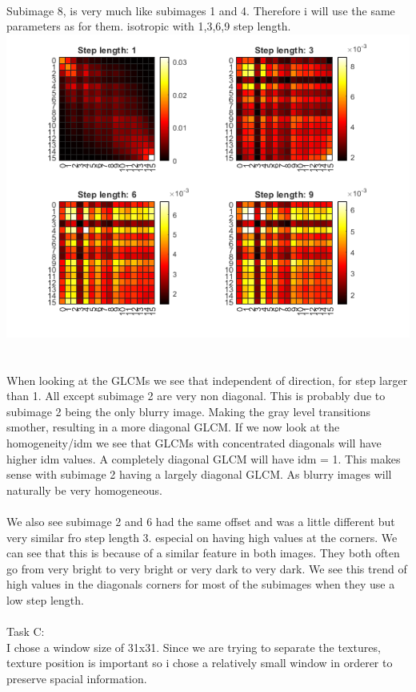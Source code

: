 \documentclass[12pt, letterpaper, twoside]{article}
\begin{document}
\newpage
\ \\
Subimage 8, is very much like subimages 1 and 4. Therefore i will use the same parameters as for them.
isotropic with 1,3,6,9 step length.\\
\includegraphics[scale=1]{"glcm8.png"}\\
\ \\
\newpage
\ \\
When looking at the GLCMs we see that independent of direction, for step larger than 1. All except subimage 2 are very non diagonal. This is probably due to subimage 2 being the only blurry image. Making the gray level transitions smother, resulting in a more diagonal GLCM. If we now look at the homogeneity/idm we see that GLCMs with concentrated diagonals will have higher idm values. A completely diagonal GLCM will have idm = 1. This makes sense with subimage 2 having a largely diagonal GLCM. As blurry images will naturally be very homogeneous.\\
\ \\
We also see subimage 2 and 6 had the same offset and was a little different but very similar fro step length 3. especial on having high values at the corners. We can see that this is because of a similar feature in both images. They both often go from very bright to very bright or very dark to very dark. We see this trend of high values in the diagonals corners for most of the subimages when they use a low step length.\\      
\newpage
\ \\
Task C:\\
I chose a window size of 31x31. Since we are trying to separate the textures, texture position is important so i chose a relatively small window in orderer to preserve spacial information.\\
\end{document}
